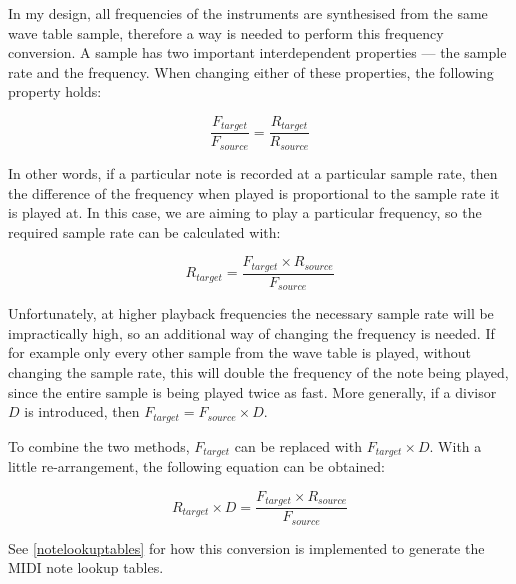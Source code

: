 In my design, all frequencies of the instruments are synthesised from the same wave table sample, 
therefore a way is needed to perform this frequency conversion.  A sample has two important 
interdependent properties --- the sample rate and the frequency.  When changing either of these 
properties, the following property holds:

\[\frac{F_{target}}{F_{source}} = \frac{R_{target}}{R_{source}}\]

In other words, if a particular note is recorded at a particular sample rate, then the difference of 
the frequency when played is proportional to the sample rate it is played at.  In this case, we are 
aiming to play a particular frequency, so the required sample rate can be calculated with:

\[R_{target} = \frac{F_{target} \times R_{source}}{F_{source}}\]

Unfortunately, at higher playback frequencies the necessary sample rate will be impractically high, 
so an additional way of changing the frequency is needed.  If for example only every other sample 
from the wave table is played, without changing the sample rate, this will double the frequency of 
the note being played, since the entire sample is being played twice as fast.  More generally, if a 
divisor $D$ is introduced, then $F_{target} = F_{source} \times D$.

To combine the two methods, $F_{target}$ can be replaced with $F_{target} \times D$.  With a little 
re-arrangement, the following equation can be obtained:

\[R_{target} \times D = \frac{F_{target} \times R_{source}}{F_{source}}\]

See \ref{notelookuptables} for how this conversion is implemented to generate the MIDI note lookup 
tables.
